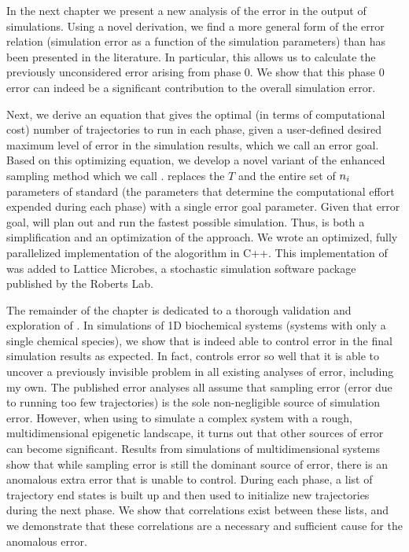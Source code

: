 In the next chapter we present a new analysis of the error in the output of  simulations. Using a novel derivation, we find a more general form of the  error relation (\ie simulation error as a function of the simulation parameters) than has been presented in the literature\supercite{Allen:2006ch,Borrero:2008il,Allen:2009kb}. In particular, this allows us to calculate the previously unconsidered error arising from phase $0$. We show that this phase $0$ error can indeed be a significant contribution to the overall simulation error.

Next, we derive an equation that gives the optimal (in terms of computational cost) number of trajectories to run in each phase, given a user-defined desired maximum level of error in the simulation results, which we call an error goal. Based on this optimizing equation, we develop a novel variant of the  enhanced sampling method which we call .  replaces the $T$ and the entire set of $n_{i}$ parameters of standard  (\ie the parameters that determine the computational effort expended during each phase) with a single error goal parameter. Given that error goal,  will plan out and run the fastest possible  simulation. Thus,  is both a simplification and an optimization of the  approach. We wrote an optimized, fully parallelized implementation of the  alogorithm in C++. This implementation of  was added to Lattice Microbes\supercite{Roberts:2013cu}, a stochastic simulation software package published by the Roberts Lab.

The remainder of the chapter is dedicated to a thorough validation and exploration of . In simulations of 1D biochemical systems (\ie systems with only a single chemical species), we show that  is indeed able to control error in the final simulation results as expected. In fact,  controls error so well that it is able to uncover a previously invisible problem in all existing analyses of  error, including my own. The published error analyses\supercite{Allen:2006ch,Borrero:2008il,Allen:2009kb} all assume that sampling error (\ie error due to running too few trajectories) is the sole non-negligible source of simulation error. However, when using  to simulate a complex system with a rough, multidimensional epigenetic landscape, it turns out that other sources of error can become significant. Results from  simulations of multidimensional systems show that while sampling error is still the dominant source of error, there is an anomalous extra error that  is unable to control. During each phase, a list of trajectory end states is built up and then used to initialize new trajectories during the next phase. We show that correlations exist between these lists, and we demonstrate that these correlations are a necessary and sufficient cause for the anomalous error.

